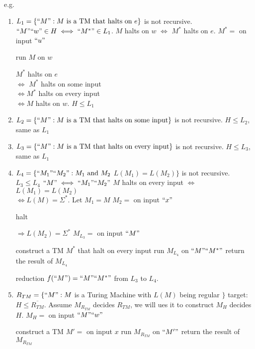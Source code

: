 e.g. 
\begin{enumerate}
    \item $L_1=\{ ``M": M \text{ is a TM that halts on }e \}$ is not recursive. 
    \subitem $``M"``w"\in H \iff ``{M^*} "\in L_1$. 
    \subitem $M$ halts on $w$ $\iff$ $M^*$ halts on $e$. 
    \subitem $M^*=$ on input $``u"$
    \begin{algorithm}[H]
        \caption{$M^*$}
        \begin{algorithmic}
            \State run $M$ on $w$
        \end{algorithmic}
    \end{algorithm}
    $M^*$ halts on $e$\\
    $\iff$ $M^*$ halts on some input\\
    $\iff M^*$ halts on every input\\
    $\iff M$ halts on $w$. 
    \subitem $H\le L_1$
    \item $L_2=\{ ``M": M \text{ is a TM that halts on some input} \}$ is not recursive. 
    \subitem $H\le L_2$, same as $L_1$
    \item $L_3=\{ ``M": M\text{ is a TM that halts on every input} \}$ is not recursive. 
    \subitem $H\le L_3$, same as $L_1$
    \item $L_4=\{ ``M_1"``M_2": M_1 \text{ and } M_2$  $L(M_1)=L(M_2) \}$ is not recursive. 
    \subitem $L_3\le L_4$
    \subitem $``M"\iff ``M_1"``M_2"$
    \subitem $M$ halts on every input $\iff$ $L(M_1)=L(M_2)$\\
    $\iff L(M)=\Sigma^*$. 
    \subitem Let $M_1=M$
    \subitem $M_2=$ on input $``x"$
    \begin{algorithm}[H]
        \caption{$M_2$}
        \begin{algorithmic}
            \State halt
        \end{algorithmic}
    \end{algorithm}
    $\Rightarrow L(M_2)=\Sigma^*$
    \subitem $M_{L_3}=$ on input $``M"$
    \begin{algorithm}[H]
        \caption{$M_{L_3}$}
        \begin{algorithmic}
            \State construct a TM $M^*$ that halt on every input
            \State run $M_{L_4}$ on $``M"``M^*"$
            \State return the result of $M_{L_4}$
        \end{algorithmic}
    \end{algorithm}
    reduction $f(``M")= ``M"``M^*"$ from $L_3$ to $L_4$. 
    \item $R_{TM}=\{ ``M": M$  is a Turing Machine with $L(M)$ being regular $\}$
    \subitem target: $H\le \overline{R_{TM}}$. Assume $M_{R_{TM}}$ decides $R_{TM}$, we will ues it to construct $M_{H}$ decides $H$. 
    \subitem $M_H=$ on input $``M"``w"$
    \begin{algorithm}[H]
        \caption{$M_H$}
        \begin{algorithmic}
            \State construct a TM $M'=$ on input $x$
            \State run $M_{R_{TM}}$ on $``M'"$
            \State return the result of $M_{R_{TM}}$
        \end{algorithmic}
    \end{algorithm}
    

\end{enumerate}
